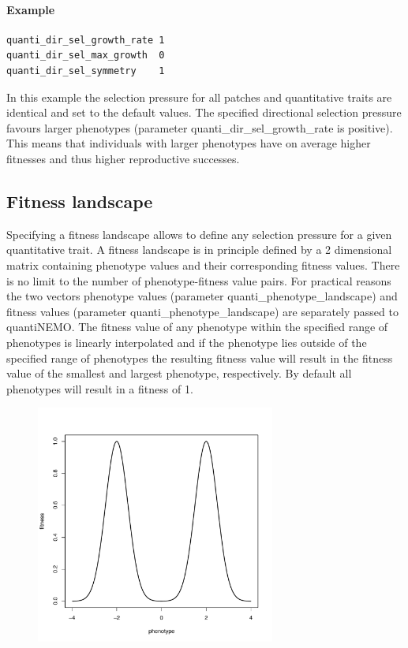 \documentclass[letterpaper,12pt,oneside]{book}
\begin{document}
\paragraph{Example}\hspace*{\fill}
\begin{lstlisting}[frame=single]
quanti_dir_sel_growth_rate 1	
quanti_dir_sel_max_growth  0	
quanti_dir_sel_symmetry    1	
\end{lstlisting}
In this example the selection pressure for all patches and quantitative traits are identical and set to the default values. The specified directional selection pressure favours larger phenotypes (parameter \textsf{quanti\_dir\_sel\_growth\_rate} is positive). This means that individuals with larger phenotypes have on average higher fitnesses and thus higher reproductive successes.

\subsection{Fitness landscape}
Specifying a fitness landscape allows to define any selection pressure for a given quantitative trait. A fitness landscape is in principle defined by a 2 dimensional matrix containing phenotype values and their corresponding fitness values. There is no limit to the number of phenotype-fitness value pairs. For practical reasons the two vectors phenotype values (parameter \textsf{quanti\_phenotype\_landscape}) and fitness values (parameter \textsf{quanti\_phenotype\_landscape}) are separately passed to quantiNEMO. The fitness value of any phenotype within the specified range of phenotypes is linearly interpolated and if the phenotype lies outside of the specified range of phenotypes the resulting fitness value will result in the fitness value of the smallest and largest phenotype, respectively. By default all phenotypes will result in a fitness of 1. 

\begin{figure}[h]
	\centering
		\includegraphics[width=0.70\textwidth]{fitness-landscape-selection.pdf}
	\label{fig:fitness-landscape-selection}
\end{figure}
\end{document}
